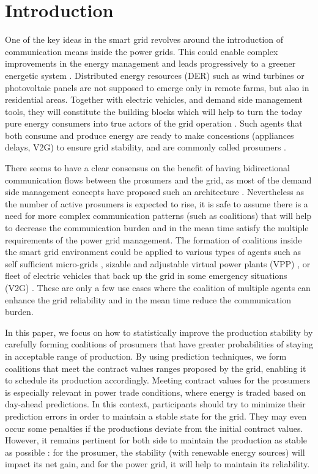 \documentclass[conference]{IEEEtran}
\begin{document}
\section{Introduction}
\label{sec:introduction}

One of the key ideas in the smart grid revolves around the introduction of communication means inside the power grids. This could enable complex improvements in the energy management and leads progressively to a greener energetic system \cite{Ramchurn} \cite{WuHamedHuangBook2011}. Distributed energy resources (DER) such as wind turbines or photovoltaic panels are not supposed to emerge only in remote farms, but also in residential areas. Together with electric vehicles, and demand side management tools, they will constitute the building blocks which will help to turn the today pure energy consumers into true actors of the grid operation \cite{Ramchurn}. Such agents that both consume and produce energy are ready to make concessions (appliances delays, V2G) to ensure grid stability, and are commonly called prosumers \cite{Rathnayaka2012} \cite{Ramchurn}.

There seems to have a clear consensus on the benefit of having bidirectional communication flows between the prosumers and the grid, as most of the demand side management concepts have proposed such an architecture \cite{WuHamedHuangBook2011}. Nevertheless as the number of active prosumers is expected to rise, it is safe to assume there is a need for more complex communication patterns (such as coalitions) that will help to decrease the communication burden and in the mean time satisfy the multiple requirements of the power grid management. The formation of coalitions inside the smart grid environment could be applied to various types of agents such as self sufficient micro-grids \cite{Pahwa}, sizable and adjustable virtual power plants (VPP) \cite{Braun, Ramchurn}, or fleet of electric vehicles that back up the grid in some emergency situations (V2G) \cite{Ramchurn}. These are only a few use cases where the coalition of multiple agents can enhance the grid reliability and in the mean time reduce the communication burden.

In this paper, we focus on how to statistically improve the production stability by carefully forming coalitions of prosumers that have greater probabilities of staying in acceptable range of production. By using prediction techniques, we form coalitions that meet the contract values ranges proposed by the grid, enabling it to schedule its production accordingly. Meeting contract values for the prosumers is especially relevant in power trade conditions, where energy is traded based on day-ahead predictions. In this context, participants should try to minimize their prediction errors in order to maintain a stable state for the grid. They may even occur some penalties if the productions deviate from the initial contract values. However, it remains pertinent for both side to maintain the production as stable as possible : for the prosumer, the stability (with renewable energy sources) will impact its net gain, and for the power grid, it will help to maintain its reliability.
\end{document}
